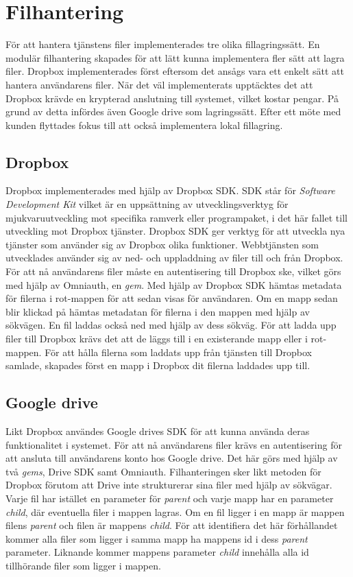 \documentclass[a4paper,12pt,oneside,final]{extbook}
\begin{document}
\section{Filhantering}
För att hantera tjänstens filer implementerades tre olika fillagringssätt. En modulär filhantering skapades för att lätt kunna implementera fler sätt att lagra filer. Dropbox implementerades först eftersom det ansågs vara ett enkelt sätt att hantera användarens filer. När det väl implementerats upptäcktes det att Dropbox krävde en krypterad anslutning till systemet, vilket kostar pengar. På grund av detta infördes även Google drive som lagringssätt. Efter ett möte med kunden flyttades fokus till att också implementera lokal fillagring.

\subsection{Dropbox}
Dropbox implementerades med hjälp av Dropbox SDK. SDK står för \textit{Software Development Kit} vilket är en uppsättning av utvecklingsverktyg för mjukvaruutveckling mot specifika ramverk eller programpaket, i det här fallet till utveckling mot Dropbox tjänster. Dropbox SDK ger verktyg för att utveckla nya tjänster som använder sig av Dropbox olika funktioner. Webbtjänsten som utvecklades använder sig av ned- och uppladdning av filer till och från Dropbox. För att nå användarens filer måste en autentisering till Dropbox ske, vilket görs med hjälp av Omniauth, en \textit{gem}. Med hjälp av Dropbox SDK hämtas metadata för filerna i rot-mappen för att sedan visas för användaren. Om en mapp sedan blir klickad på hämtas metadatan för filerna i den mappen med hjälp av sökvägen. En fil laddas också ned med hjälp av dess sökväg. För att ladda upp filer till Dropbox krävs det att de läggs till i en existerande mapp eller i rot-mappen. För att hålla filerna som laddats upp från tjänsten till Dropbox samlade, skapades först en mapp i Dropbox dit filerna laddades upp till.

\subsection{Google drive}
Likt Dropbox användes Google drives SDK för att kunna använda deras funktionalitet i systemet. För att nå användarens filer krävs en autentisering för att ansluta till användarens konto hos Google drive. Det här görs med hjälp av två \textit{gems}, Drive SDK samt Omniauth. Filhanteringen sker likt metoden för Dropbox förutom att Drive inte strukturerar sina filer med hjälp av sökvägar. Varje fil har istället en parameter för \textit{parent} och varje mapp har en parameter \textit{child}, där eventuella filer i mappen lagras. Om en fil ligger i en mapp är mappen filens \textit{parent} och filen är mappens \textit{child}. För att identifiera det här förhållandet kommer alla filer som ligger i samma mapp ha mappens id i dess \textit{parent} parameter. Liknande kommer mappens parameter \textit{child} innehålla alla id tillhörande filer som ligger i mappen.
\end{document}
